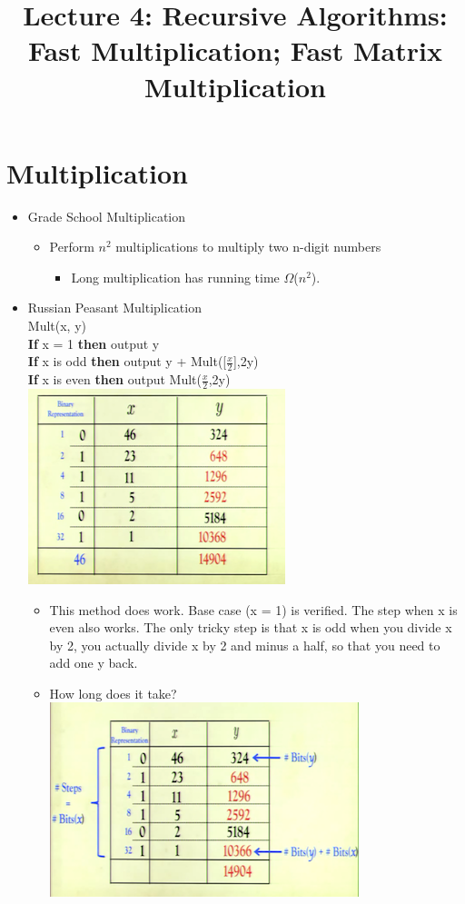 \documentclass[12pt]{article}
\title{\huge Lecture 4: Recursive Algorithms: Fast Multiplication; Fast Matrix Multiplication}
\author{}
\date{}
\begin{document}
\maketitle
\section{Multiplication}
\renewcommand{\labelitemii}{$\circ$}
\renewcommand{\labelitemiii}{$\cdot$}
\renewcommand{\labelitemiii}{$\rightarrow$}
\begin{itemize}
\item{Grade School Multiplication}
	\begin{itemize}
	\item Perform $n^2$ multiplications to multiply two n-digit numbers
		\begin{itemize}
		\item Long multiplication has running time $\Omega$($n^2$).
		\end{itemize}
	\end{itemize}
\item Russian Peasant Multiplication\\
	Mult(x, y)\\
	\textbf{If} x = 1 \textbf{then} output y\\
	\textbf{If} x is odd \textbf{then} output y + Mult([{\large $\frac{x}{2}$}],2y)\\
	\textbf{If} x is even \textbf{then} output Mult({\large $\frac{x}{2}$},2y)\\
	\includegraphics{lecture41}
	\begin{itemize}
	\item This method does work. Base case (x = 1) is verified. The step when x is even also works. The only tricky step is that x is odd when you divide x by 2, you actually divide x by 2 and minus a half, so that you need to add one y back.
	\item How long does it take? \\
	\includegraphics{lecture42}

\end{itemize}
\end{itemize}
\end{document}
